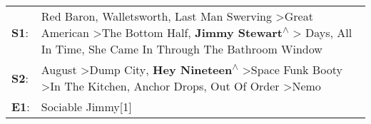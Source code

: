 \begin{supertabular}{p{0.03\textwidth}p{0.92\textwidth}}
 \textbf{S1}:  &  Red Baron\textsuperscript{}, \enspace Walletsworth\textsuperscript{}, \enspace Last Man Swerving\textsuperscript{} \textgreater \enspace Great American\textsuperscript{} \textgreater \enspace The Bottom Half\textsuperscript{}, \enspace \textbf{Jimmy Stewart\textsuperscript{$\wedge$}} \textgreater {} Days\textsuperscript{}, \enspace All In Time\textsuperscript{}, \enspace She Came In Through The Bathroom Window\textsuperscript{}  \enspace  \\
 \textbf{S2}:  &                                                                       August\textsuperscript{} \textgreater \enspace Dump City\textsuperscript{}, \enspace \textbf{Hey Nineteen\textsuperscript{$\wedge$}} \textgreater \enspace Space Funk Booty\textsuperscript{} \textgreater \enspace In The Kitchen\textsuperscript{}, \enspace Anchor Drops\textsuperscript{}, \enspace Out Of Order\textsuperscript{} \textgreater \enspace Nemo\textsuperscript{}  \enspace  \\
 \textbf{E1}:  &                                                                                                                                                                                                                                                                                                                                                                                                                       Sociable Jimmy[1]\textsuperscript{}  \enspace  \\
\end{supertabular}
